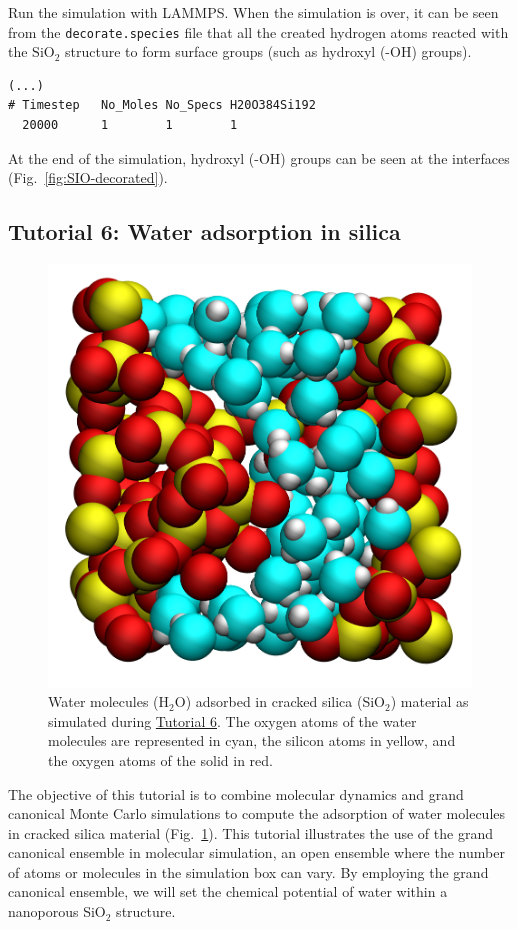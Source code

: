 \documentclass[9pt,tutorial]{livecoms}
\newcommand{\flecmd}[1]{\textcolor{command}{\texttt{#1}}} %
\begin{document}
Run the simulation with LAMMPS.  When the simulation is over,
it can be seen from the \flecmd{decorate.species} file that
all the created hydrogen atoms reacted with the $\text{SiO}_{2}$ structure to
form surface groups (such as hydroxyl (-OH) groups).
\begin{lstlisting}
(...)
# Timestep   No_Moles No_Specs H20O384Si192
  20000      1        1        1
\end{lstlisting}
At the end of the simulation, hydroxyl (-OH) groups can be seen at the interfaces
(Fig.~\ref{fig:SIO-decorated}).

\subsection{Tutorial 6: Water adsorption in silica}
\label{gcmc-silica-label}

\begin{figure}
\centering
\includegraphics[width=0.6\linewidth]{GCMC}
\caption{Water molecules (H$_2$O) adsorbed in cracked silica (SiO$_2$) material as simulated
during \hyperref[gcmc-silica-label]{Tutorial 6}.  The oxygen atoms of the water
molecules are represented in cyan, the silicon atoms in yellow, and the oxygen
atoms of the solid in red.}
\label{fig:GCMC}
\end{figure}

The objective of this tutorial is to combine molecular dynamics and
grand canonical Monte Carlo simulations to compute the adsorption of water
molecules in cracked silica material (Fig.~\ref{fig:GCMC}).  This tutorial
illustrates the use of the grand canonical ensemble in molecular simulation, an
open ensemble where the number of atoms or molecules in the simulation box can vary.
By employing the grand canonical ensemble, we will set the chemical
potential of water within a nanoporous SiO$_2$ structure.
\end{document}
